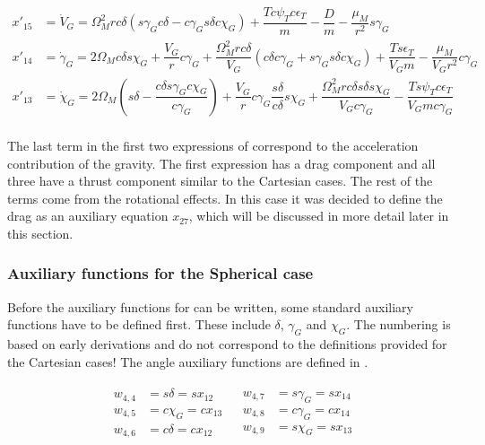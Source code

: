 \begin{equation} \label{eq:dynEqSp}
\begin{split}
x'_{15} &= \dot{V}_{G} =  \Omega_{M}^{2} r c\delta \left(s\gamma_{G}c\delta-c\gamma_{G}s\delta c\chi_{G}\right)+\dfrac{Tc\psi_{T}c\epsilon_{T}}{m}-\dfrac{D}{m}-\dfrac{\mu_{M}}{r^{2}}s\gamma_{G} \\
x'_{14} &= \dot{\gamma}_{G} = 2\Omega_{M}c\delta s\chi_{G} + \dfrac{V_{G}}{r}c\gamma_{G}+\dfrac{\Omega_{M}^{2}r c\delta}{V_{G}}\left(c\delta c\gamma_{G}+s\gamma_{G} s\delta c\chi_{G}\right)+\dfrac{T s\epsilon_{T}}{V_{G}m}-\dfrac{\mu_{M}}{V_{G}r^{2}}c\gamma_{G} \\
x'_{13} &= \dot{\chi}_{G} = 2 \Omega_{M} \left(s\delta-\dfrac{c\delta s\gamma_{G} c\chi_{G}}{c \gamma_{G}}\right)+\dfrac{V_{G}}{r}c\gamma_{G}\dfrac{s\delta}{c \delta}s\chi_{G}+\dfrac{\Omega_{M}^{2}r c\delta s\delta s\chi_{G}}{V_{G}c\gamma_{G}}-\dfrac{T s\psi_{T}c\epsilon_{T}}{V_{G}m c\gamma_{G}} \\
\end{split}
\end{equation}

The last term in the first two expressions of  correspond to the acceleration contribution of the gravity. The first expression has a drag component and all three have a thrust component similar to the Cartesian cases. The rest of the terms come from the rotational effects. In this case it was decided to define the drag as an auxiliary equation $x_{27}$, which will be discussed in more detail later in this section.

\subsubsection{Auxiliary functions for the Spherical case}
\label{subsubsec:auxFspher}
Before the auxiliary functions for  can be written, some standard auxiliary functions have to be defined first. These include $\delta$, $\gamma_{G}$ and $\chi_{G}$. The numbering is based on early derivations and do not correspond to the definitions provided for the Cartesian cases! The angle auxiliary functions are defined in .

\begin{align} \label{eq:SpherAnglF}
\begin{split}
w_{4,4} &= s\delta = s x_{12}  \\
w_{4,5} &= c\chi_{G} = c x_{13} \\
w_{4,6} &= c\delta = c x_{12} \\
\end{split}
&
\begin{split}
w_{4,7} &= s\gamma_{G} = s x_{14} \\
w_{4,8} &= c\gamma_{G} = c x_{14} \\
w_{4,9} &= s\chi_{G} = s x_{13} \\
\end{split}
\end{align}


